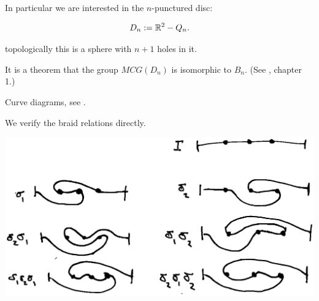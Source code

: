 \documentclass[12pt,a4paper]{article}
\begin{document}
In particular we are interested in the $n$-punctured disc:

    $$ D_n := \mathbb{R}^2 - Q_n.$$

topologically this is a sphere with $n+1$ holes in it.

It is a theorem that the group $MCG(D_n)$ is isomorphic to $B_n.$
(See \cite{Kassel10}, chapter 1.)

Curve diagrams, see \cite{Dehornoy02}.

We verify the braid relations directly.


\begin{center}
\includegraphics{curve-braid.eps}
\end{center}




{}

\end{document}
